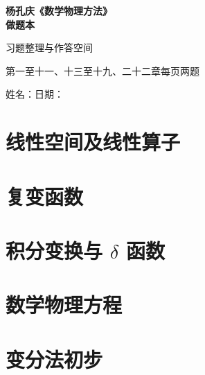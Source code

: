 \documentclass[UTF8,a4paper,12pt,oneside,openany,fontset=fandol]{ctexbook}
\begin{document}
\begin{titlepage}
  \centering
  \vspace*{.24\textheight}
  {\Huge\bfseries 杨孔庆《数学物理方法》\\[0.6em]做题本\par}
  \vspace{1.8cm}
  {\Large 习题整理与作答空间\par}
  \vspace{0.8cm}
  {\large 第一至十一、十三至十九、二十二章\quad 每页两题\par}
  \vfill
  {\large 姓名：\underline{\hspace{4cm}}\quad 日期：\underline{\hspace{3cm}}\par}
\end{titlepage}

\frontmatter
\tableofcontents
\clearpage

\mainmatter
\part{线性空间及线性算子}




\part{复变函数}






\part{积分变换与 $\delta$ 函数}




\part{数学物理方程}
\setcounter{chapter}{12}








\part{变分法初步}
\setcounter{chapter}{21}

\end{document}
